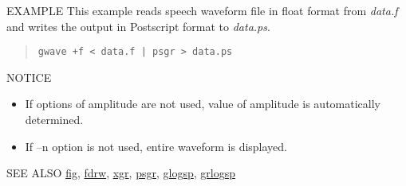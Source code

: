 \begin{qsection}{EXAMPLE}
This example reads speech waveform file in float format from
{\em data.f} and writes the output in Postscript format to
{\em data.ps}.
\begin{quote}
 \verb!gwave +f < data.f | psgr > data.ps!
 \end{quote}
\end{qsection}

\begin{qsection}{NOTICE}
\begin{itemize}
\item If options of amplitude are not used, value of amplitude is
automatically determined.
\item If --n option is not used, entire waveform is displayed.
\end{itemize}
\end{qsection}

\begin{qsection}{SEE ALSO}
\hyperlink{fig}{fig},
\hyperlink{fdrw}{fdrw},
\hyperlink{xgr}{xgr},
\hyperlink{psgr}{psgr},
\hyperlink{glogsp}{glogsp},
\hyperlink{grlogsp}{grlogsp}
\end{qsection}
